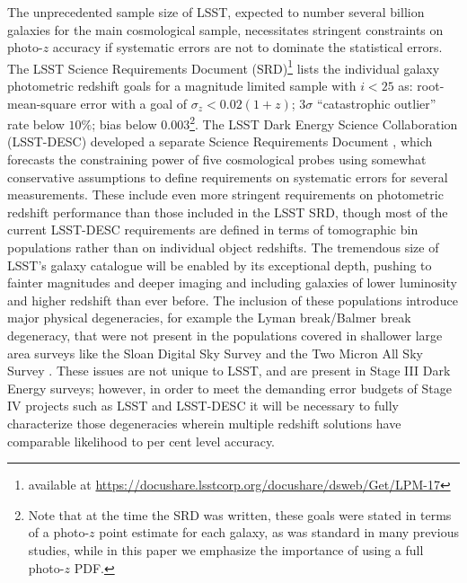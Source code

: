 The unprecedented sample size of LSST, expected to number several billion galaxies for the main cosmological sample, necessitates stringent constraints on photo-$z$ accuracy if systematic errors are not to dominate the statistical errors.
The LSST Science Requirements Document (SRD)\footnote{available at \url{https://docushare.lsstcorp.org/docushare/dsweb/Get/LPM-17}} lists the individual galaxy photometric redshift goals for a magnitude limited sample with $i<25$ as: root-mean-square error with a goal of $\sigma_z<0.02(1+z)$; $3\sigma$ ``catastrophic outlier'' rate below $10\%$; bias below $0.003$\footnote{
Note that at the time the SRD was written, these goals were stated in terms of a photo-$z$ point estimate for each galaxy, as was standard in many previous studies, while in this paper we emphasize the importance of using a full photo-$z$ PDF.}.  The LSST Dark Energy Science Collaboration (LSST-DESC) developed a separate Science Requirements Document \citep{Mandelbaum:2018}, which forecasts the constraining power of five cosmological probes using somewhat conservative assumptions to define requirements on systematic errors for several measurements.  These include even more stringent requirements on photometric redshift performance than those included in the LSST SRD, though most of the current LSST-DESC requirements are defined in terms of tomographic bin populations rather than on individual object redshifts.  The tremendous size of LSST's galaxy catalogue will be enabled by its exceptional depth, pushing to fainter magnitudes and deeper imaging and including galaxies of lower luminosity and higher redshift than ever before.
The inclusion of these populations introduce major physical degeneracies, for example the Lyman break/Balmer break degeneracy, that were not present in the populations covered in shallower large area surveys like the Sloan Digital Sky Survey \citep[SDSS,][]{York:00} and the Two Micron All Sky Survey \citep[2MASS,][]{Skrutskie:06}.  These issues are not unique to LSST, and are present in Stage III Dark Energy surveys; however,
in order to meet the demanding error budgets of Stage IV projects such as LSST and LSST-DESC it will be necessary to fully characterize those degeneracies wherein multiple redshift solutions have comparable likelihood to per cent level accuracy.

